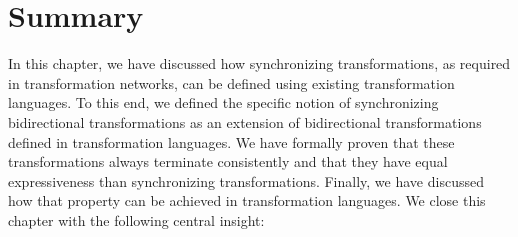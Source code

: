 \section{Summary}


In this chapter, we have discussed how synchronizing transformations, as required in transformation networks, can be defined using existing transformation languages.
To this end, we defined the specific notion of synchronizing bidirectional transformations as an extension of bidirectional transformations defined in transformation languages.
We have formally proven that these transformations always terminate consistently and that they have equal expressiveness than synchronizing transformations.
Finally, we have discussed how that property can be achieved in transformation languages.
We close this chapter with the following central insight:

